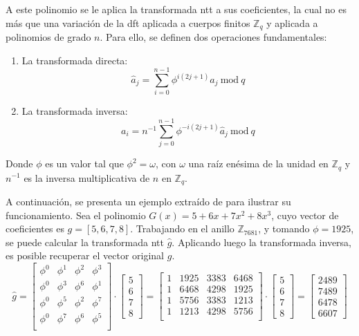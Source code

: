 A este polinomio se le aplica la transformada \acrshort{ntt} a sus coeficientes, la cual no es más que una variación de la \acrshort{dft} aplicada a cuerpos finitos \(\mathbb{Z}_q\) y aplicada a polinomios de grado \(n\). Para ello, se definen dos operaciones fundamentales:
\begin{enumerate}
	\item La transformada directa:
	\begin{equation}
		\hat{a}_j=\sum_{i=0}^{n-1} \phi^{i\left(2j+1\right)} a_j \ \text{mod} \ q
	\end{equation}
	\item  La transformada inversa:
	\begin{equation}
		a_i=n^{-1} \sum_{j=0}^{n-1} \phi^{-i\left(2j+1\right)} \hat{a}_j \ \text{mod} \ q
	\end{equation}
\end{enumerate}

Donde $\phi$ es un valor tal que $\phi^2=\omega$, con $\omega$ una raíz enésima de la unidad en \(\mathbb{Z}_q\) y \(n^{-1}\) es la inversa multiplicativa de \(n\) en \(\mathbb{Z}_q\).
\newline

A continuación, se presenta un ejemplo extraído de \cite{cryptoeprint:2024/585} para ilustrar su funcionamiento. Sea el polinomio \(G(x)=5+6x+7x^2+8x^3\), cuyo vector de coeficientes es \(g=[5,6,7,8]\). Trabajando en el anillo \(\mathbb{Z}_{7681}\), y tomando $\phi=1925$, se puede calcular la transformada \acrshort{ntt} \(\hat{g}\). Aplicando luego la transformada inversa, es posible recuperar el vector original \(g\).
\begin{equation}
	\hat{g}=\begin{bmatrix}
		\phi^0 & \phi^1 & \phi^2 & \phi^3\\
		\phi^0 & \phi^3 & \phi^6 & \phi^1\\
		\phi^0 & \phi^5 & \phi^2 & \phi^7\\
		\phi^0 & \phi^7 & \phi^6 & \phi^5\\
	\end{bmatrix} \cdot \begin{bmatrix}
	5\\
	6\\
	7\\
	8
	\end{bmatrix}=\begin{bmatrix}
	1 & 1925 & 3383 & 6468\\
	1 & 6468 & 4298 & 1925\\
	1 & 5756 & 3383 & 1213\\
	1 & 1213 & 4298 & 5756\\
	\end{bmatrix} \cdot \begin{bmatrix}
	5\\
	6\\
	7\\
	8 \end{bmatrix}= \begin{bmatrix}
	2489\\
	7489\\
	6478\\
	6607 \end{bmatrix}
\end{equation}

